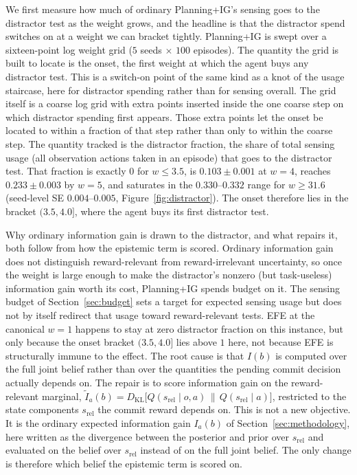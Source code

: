 We first measure how much of ordinary Planning+IG's sensing goes to the distractor test as the weight grows, and the headline is that the distractor spend switches on at a weight we can bracket tightly. Planning+IG is swept over a sixteen-point log weight grid ($5$ seeds $\times$ $100$ episodes). The quantity the grid is built to locate is the onset, the first weight at which the agent buys any distractor test. This is a switch-on point of the same kind as a knot of the usage staircase, here for distractor spending rather than for sensing overall. The grid itself is a coarse log grid with extra points inserted inside the one coarse step on which distractor spending first appears. Those extra points let the onset be located to within a fraction of that step rather than only to within the coarse step. The quantity tracked is the distractor fraction, the share of total sensing usage (all observation actions taken in an episode) that goes to the distractor test. That fraction is exactly $0$ for $w \le 3.5$, is $0.103 \pm 0.001$ at $w{=}4$, reaches $0.233 \pm 0.003$ by $w{=}5$, and saturates in the $0.330$--$0.332$ range for $w \ge 31.6$ (seed-level SE $0.004$--$0.005$, Figure~\ref{fig:distractor}). The onset therefore lies in the bracket $(3.5, 4.0]$, where the agent buys its first distractor test.

Why ordinary information gain is drawn to the distractor, and what repairs it, both follow from how the epistemic term is scored. Ordinary information gain does not distinguish reward-relevant from reward-irrelevant uncertainty, so once the weight is large enough to make the distractor's nonzero (but task-useless) information gain worth its cost, Planning+IG spends budget on it. The sensing budget of Section~\ref{sec:budget} sets a target for expected sensing usage but does not by itself redirect that usage toward reward-relevant tests. EFE at the canonical $w{=}1$ happens to stay at zero distractor fraction on this instance, but only because the onset bracket $(3.5, 4.0]$ lies above $1$ here, not because EFE is structurally immune to the effect. The root cause is that $I(b)$ is computed over the full joint belief rather than over the quantities the pending commit decision actually depends on. The repair is to score information gain on the reward-relevant marginal, $\tilde{I}_a(b) = D_{\mathrm{KL}}\!\big[Q(s_{\mathrm{rel}} \mid o, a) \,\|\, Q(s_{\mathrm{rel}} \mid a)\big]$, restricted to the state components $s_{\mathrm{rel}}$ the commit reward depends on. This is not a new objective. It is the ordinary expected information gain $I_a(b)$ of Section~\ref{sec:methodology}, here written as the divergence between the posterior and prior over $s_{\mathrm{rel}}$ and evaluated on the belief over $s_{\mathrm{rel}}$ instead of on the full joint belief. The only change is therefore which belief the epistemic term is scored on.


